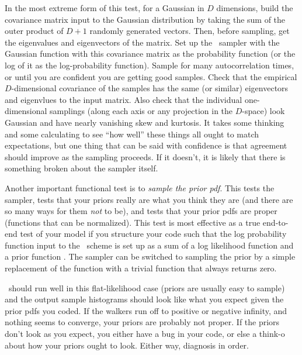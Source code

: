 \documentclass[12pt,twoside,pdftex]{article}
\newcommand{\MCMC}{\acronym{MCMC}}
\begin{document}
In the most extreme form of this test,
  for a Gaussian in $D$ dimensions,
  build the covariance matrix input to the Gaussian distribution
  by taking the sum of the outer product of $D+1$ randomly generated vectors.
Then, before sampling, get the eigenvalues and eigenvectors of the matrix.
Set up the \MCMC\ sampler with the Gaussian function with this covariance matrix
  as the probability function (or the log of it as the log-probability function).
Sample for many autocorrelation times,
  or until you are confident you are getting good samples.
Check that the empirical $D$-dimensional covariance of the samples
  has the same (or similar) eigenvectors and eigenvlues to the input matrix.
Also check that the individual one-dimensional samplings
  (along each axis or any projection in the $D$-space)
  look Gaussian and have nearly vanishing skew and kurtosis.
It takes some thinking and some calculating to see ``how well'' these things all ought to match
  expectations, but one thing that can be said with confidence is that agreement should improve
  as the sampling proceeds.
If it doesn't, it is likely that there is something broken about the sampler itself.

Another important functional test is to \emph{sample the prior pdf}.
This tests the sampler,
  tests that your priors really are what you think they are
  (and there are so many ways for them \emph{not} to be), and tests that
  your prior pdfs are proper (functions that can be normalized).
This test is most effective as a true end-to-end test of your model
  if you structure your code such that the log probability function 
  input to the \MCMC\ scheme
  is set up as a sum of a log likelihood function 
  and a prior function .
The sampler can be switched to sampling the prior by a simple replacement
  of the  function
  with a trivial function that always returns zero.

\MCMC\ should run well in this flat-likelihood case (priors are usually easy to sample)
  and the output sample histograms should look like what you expect
  given the prior pdfs you coded.
If the walkers run off to positive or negative infinity,
  and nothing seems to converge,
  your priors are probably not proper.
If the priors don't look as you expect,
  you either have a bug in your code,
  or else a think-o about how your priors ought to look.
Either way, diagnosis in order.
\end{document}
